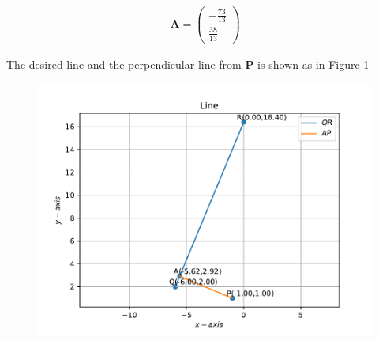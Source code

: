 \documentclass[12pt]{article}
\newcommand{\myvec}[1]{\ensuremath{\begin{pmatrix}#1\end{pmatrix}}}
\let\vec\mathbf
\begin{document}
\begin{enumerate}
\begin{enumerate}
\begin{align}
	\vec{A} = \myvec{ -\frac{73}{13} \\ \frac{38}{13} }
\end{align}
\end{enumerate}
The desired line and the perpendicular line from $\vec{P}$ is shown as in Figure \ref{fig:Fig1}
\begin{figure}[!h]
	\begin{center}
		\includegraphics[width=\columnwidth]{./figs/problem4.pdf}
	\end{center}
\caption{}
\label{fig:Fig1}
\end{figure}
\end{enumerate}
\end{document}
